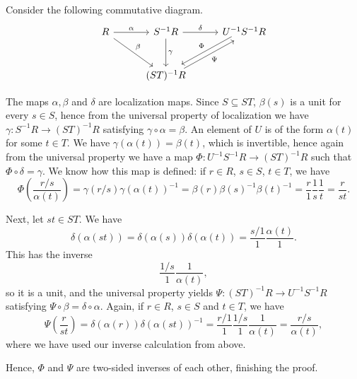 Consider the following commutative diagram.
\[\begin{tikzcd}[row sep=1cm, column sep=1cm]
	R\ar[r, "\alpha"]\ar[dr, "\beta"] & S^{-1}R\ar[r, "\delta"]\ar[d, "\gamma"] & U^{-1}S^{-1}R\ar[dl, shift right, "\Phi" above left]\\
	& (ST)^{-1}R\ar[ur, shift right, "\Psi" below right]
\end{tikzcd}\]

The maps $\alpha, \beta$ and $\delta$ are localization maps. Since
$S \subseteq ST$, $\beta(s)$ is a unit for every $s \in S$,
hence from the universal property of localization we have
$\gamma\colon S^{-1}R \to (ST)^{-1}R$ satisfying $\gamma \circ \alpha = \beta$. An element of
$U$ is of the form $\alpha(t)$ for some $t \in T$. We have
$\gamma(\alpha(t)) = \beta(t)$, which is invertible, hence again from
the universal property we have a map $\Phi\colon U^{-1}S^{-1}R \to (ST)^{-1}R$
such that $\Phi \circ \delta = \gamma$.
We know how this map is defined: if $r \in R$, $s \in S$, $t \in T$, we have
\[ \Phi\left(\frac{r/s}{\alpha(t)}\right) = \gamma(r/s)\gamma(\alpha(t))^{-1}
= \beta(r)\beta(s)^{-1}\beta(t)^{-1} = \frac{r}{1}\frac{1}{s}\frac{1}{t} = \frac{r}{st}. \]

Next, let $st \in ST$. We have
\[ \delta(\alpha(st)) = \delta(\alpha(s))\delta(\alpha(t)) = \frac{s/1}{1}\frac{\alpha(t)}{1}. \]
This has the inverse
\[ \frac{1/s}{1}\frac{1}{\alpha(t)}, \]
so it is a unit, and the universal property yields $\Psi\colon (ST)^{-1}R\to U^{-1}S^{-1}R$
satisfying $\Psi \circ \beta = \delta \circ \alpha$.
Again, if $r \in R$, $s \in S$ and $t \in T$, we have
\[ \Psi\left(\frac{r}{st}\right) = \delta(\alpha(r))\delta(\alpha(st))^{-1} = \frac{r/1}{1}\frac{1/s}{1}\frac{1}{\alpha(t)} = \frac{r/s}{\alpha(t)}, \]
where we have used our inverse calculation from above.

Hence, $\Phi$ and $\Psi$ are two-sided inverses of each other, finishing the proof.
